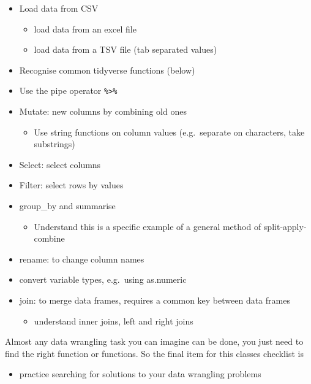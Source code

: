 \documentclass[
]{book}
\providecommand{\tightlist}{%
  \setlength{\itemsep}{0pt}\setlength{\parskip}{0pt}}
\begin{document}
\begin{itemize}
\tightlist
\item
  Load data from CSV

  \begin{itemize}
  \tightlist
  \item
    load data from an excel file
  \item
    load data from a TSV file (tab separated values)
  \end{itemize}
\item
  Recognise common tidyverse functions (below)
\item
  Use the pipe operator \texttt{\%\textgreater{}\%}
\item
  Mutate: new columns by combining old ones

  \begin{itemize}
  \tightlist
  \item
    Use string functions on column values (e.g.~separate on characters, take substrings)
  \end{itemize}
\item
  Select: select columns
\item
  Filter: select rows by values
\item
  group\_by and summarise

  \begin{itemize}
  \tightlist
  \item
    Understand this is a specific example of a general method of split-apply-combine
  \end{itemize}
\item
  rename: to change column names
\item
  convert variable types, e.g.~using as.numeric
\item
  join: to merge data frames, requires a common key between data frames

  \begin{itemize}
  \tightlist
  \item
    understand inner joins, left and right joins
  \end{itemize}
\end{itemize}

Almost any data wrangling task you can imagine can be done, you just need to find the right function or functions. So the final item for this classes checklist is

\begin{itemize}
\tightlist
\item
  practice searching for solutions to your data wrangling problems
\end{itemize}
\end{document}
